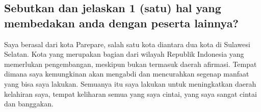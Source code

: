 \documentclass[../main.tex]{subfiles}
\begin{document}
\subsection{Sebutkan dan jelaskan 1 (satu) hal yang membedakan anda dengan peserta lainnya?}

Saya berasal dari kota Parepare, salah satu kota diantara dua kota di Sulawesi Selatan. Kota yang merupakan bagian dari wilayah Republik Indonesia yang memerlukan pengembangan, meskipun bukan termasuk daerah afirmasi. Tempat dimana saya kemungkinan akan mengabdi dan mencurahkan segenap manfaat yang bisa saya lakukan. Semuanya itu saya lakukan untuk meningkatkan daerah kelahiran saya, tempat keliharan semua yang saya cintai, yang saya sangat cintai dan banggakan.










%
%

\end{document}
